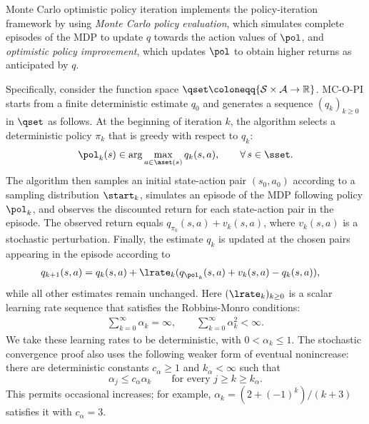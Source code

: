 Monte Carlo optimistic policy iteration implements the policy-iteration framework by using
\textit{Monte Carlo policy evaluation}, which simulates complete episodes of the MDP to update $q$ towards the action values of $\pol$,
and \textit{optimistic policy improvement}, which updates $\pol$ to obtain higher returns as anticipated by $q$.

Specifically, consider the function space $\qset \coloneqq \{ \mathcal S \times \mathcal A \to \mathbb R \}$.
MC-O-PI starts from a finite deterministic estimate $q_0$ and generates a sequence $(q_k)_{k \ge 0}$ in $\qset$ as follows.
At the beginning of iteration $k$, the algorithm selects a deterministic policy $\pi_k$ that is greedy with respect to $q_k$:
\begin{align}
\label{eq: greedy policy definition}
    \pol_k(s) \in \arg\max_{a \in \aset(s)} q_k(s,a),
    \qquad \forall \, s \in \sset .
\end{align}
The algorithm then samples an initial state-action pair $(s_0, a_0)$ according to a sampling distribution $\start_k$,
simulates an episode of the MDP following policy $\pol_k$, and observes the discounted return for each state-action pair in the episode.
The observed return equals $q_{\pi_k}(s,a) + v_k(s,a)$, where $v_k(s,a)$ is a stochastic perturbation.
Finally, the estimate $q_k$ is updated at the chosen pairs appearing in the episode
according to
\begin{align}
\label{eq: MC eval update}
    q_{k+1}(s, a)
    &= q_k(s,a) +  \lrate_k( q_{\pol_k}(s, a) + v_k(s, a) - q_k(s,a) ) ,
\end{align}
while all other estimates remain unchanged. Here $(\lrate_k)_{k \ge 0}$ is a scalar learning rate sequence that satisfies the Robbins-Monro conditions:
\begin{align}
 \label{eq: robbins monro conditions}
    \sum_{k =0}^\infty \alpha_k = \infty ,
    \qquad
    \sum_{k =0}^\infty \alpha_k^2 < \infty .
\end{align}
We take these learning rates to be deterministic, with $0<\alpha_k\le1$. The stochastic convergence proof also uses the following weaker form of eventual nonincrease: there are deterministic constants $c_\alpha\ge1$ and $k_\alpha<\infty$ such that
\begin{equation}
\label{eq:comparison}
\alpha_j\le c_\alpha\alpha_k\qquad\text{for every }j\ge k\ge k_\alpha.
\end{equation}
This permits occasional increases; for example, $\alpha_k=(2+(-1)^k)/(k+3)$ satisfies it with $c_\alpha=3$.

